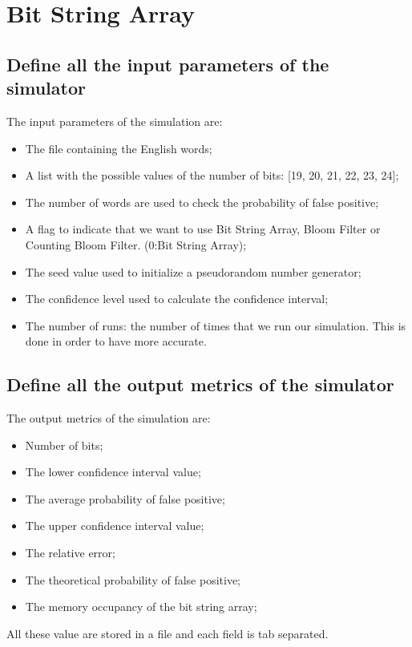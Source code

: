 \documentclass[twocolumn,letterpaper]{report}
\begin{document}
{			\newpage
					
			
			\section{Bit String Array}	 
	 
				\subsection{Define all the input parameters of the simulator}
					The input parameters of the simulation are:
					\begin{itemize}
						\item The file containing the English words;
						\item A list with the possible values of the number of bits: [19, 20, 21, 22, 23, 24];
						\item The number of words are used to check the probability of false positive;
						\item A flag to indicate that we want to use Bit String Array, Bloom Filter or Counting Bloom Filter. (0:Bit String Array);
						\item The seed value used to initialize a pseudorandom number generator;
						\item The confidence level used to calculate the confidence interval;
						\item The number of runs: the number of times that we run our simulation. This is done in order to have more accurate.
					\end{itemize}
					 
				\subsection{Define all the output metrics of the simulator}
				The output metrics of the simulation are:
				\begin{itemize}
					\item Number of bits;
					\item The lower confidence interval value;
					\item The average probability of false positive;
					\item The upper confidence interval value;
					\item The relative error;
					\item The theoretical probability of false positive;
					\item The memory occupancy of the bit string array;
				\end{itemize}
				All these value are stored in a file and each field is tab separated.
			
}
\end{document}
